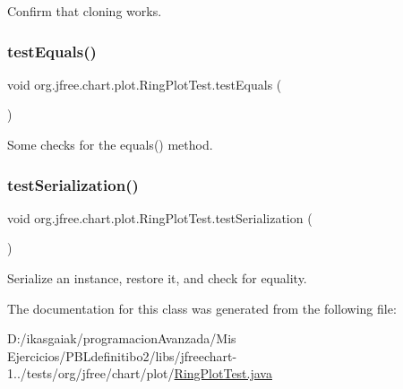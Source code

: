 Confirm that cloning works. \mbox{\label{classorg_1_1jfree_1_1chart_1_1plot_1_1_ring_plot_test_ac4d78f05484500c90c96e79875ff6cc7}} 
\subsubsection{\texorpdfstring{test\+Equals()}{testEquals()}}
{\footnotesize\ttfamily void org.\+jfree.\+chart.\+plot.\+Ring\+Plot\+Test.\+test\+Equals (\begin{DoxyParamCaption}{ }\end{DoxyParamCaption})}

Some checks for the equals() method. \mbox{\label{classorg_1_1jfree_1_1chart_1_1plot_1_1_ring_plot_test_a4a541fcfb6b0664dd5d100d7841faecf}} 
\subsubsection{\texorpdfstring{test\+Serialization()}{testSerialization()}}
{\footnotesize\ttfamily void org.\+jfree.\+chart.\+plot.\+Ring\+Plot\+Test.\+test\+Serialization (\begin{DoxyParamCaption}{ }\end{DoxyParamCaption})}

Serialize an instance, restore it, and check for equality. 

The documentation for this class was generated from the following file\+:\begin{DoxyCompactItemize}
\item 
D\+:/ikasgaiak/programacion\+Avanzada/\+Mis Ejercicios/\+P\+B\+Ldefinitibo2/libs/jfreechart-\/1../tests/org/jfree/chart/plot/\mbox{\hyperlink{_ring_plot_test_8java}{Ring\+Plot\+Test.\+java}}\end{DoxyCompactItemize}
